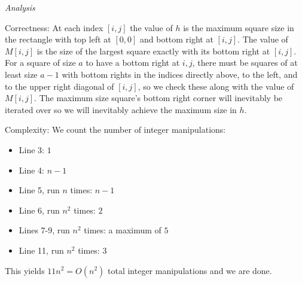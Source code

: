\documentclass{amsart}
\begin{document}
\medskip \noindent \emph{Analysis}

\medskip \noindent Correctness: At each index $[i, j]$ the value of $h$ is the maximum square size in the rectangle with top left at $[0, 0]$ and bottom right at $[i, j]$. The value of $M[i, j]$ is the size of the largest square exactly with its bottom right at $[i, j]$. 
For a square of size $a$ to have a bottom right at $i, j$, there must be squares of at least size $a-1$ with bottom rights in the indices directly above, to the left, and to the upper right diagonal of $[i, j]$, so we check these along with the value of $M[i, j]$. The maximum size square's bottom right corner will inevitably be iterated over so we will inevitably achieve the maximum size in $h$. 

\medskip \noindent Complexity: We count the number of integer manipulations:
\begin{itemize}
	\item Line 3: $1$
	\item Line 4: $n-1$
	\item Line 5, run $n$ times: $n-1$
	\item Line 6, run $n^2$ times: $2$
	\item Lines 7-9, run $n^2$ times: a maximum of $5$
	\item Line 11, run $n^2$ times: $3$
\end{itemize}

\medskip \noindent This yields $11n^2 = O(n^2)$ total integer manipulations and we are done.
\end{document}
